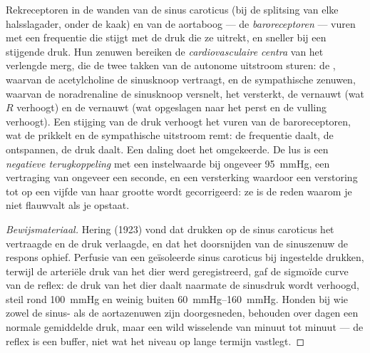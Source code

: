 \begin{definition}[De baroreflex]\label{def:b2:blood-pressure:baroreflex}
Rekreceptoren in de wanden van de sinus caroticus (bij de splitsing van
elke halsslagader, onder de kaak) en van de aortaboog --- de
\emph{baroreceptoren} --- vuren met een frequentie die stijgt met de druk die
ze uitrekt, en sneller bij een stijgende druk. Hun zenuwen bereiken de
\emph{cardiovasculaire centra} van het verlengde merg, die de twee takken
van de autonome uitstroom sturen: de , waarvan de acetylcholine
de sinusknoop vertraagt, en de sympathische zenuwen, waarvan de noradrenaline
de sinusknoop versnelt, het  versterkt, de  vernauwt
(wat $R$ verhoogt) en de  vernauwt (wat opgeslagen  naar het 
perst en de vulling verhoogt). Een stijging van de druk verhoogt het vuren
van de baroreceptoren, wat de  prikkelt en de sympathische
uitstroom remt: de frequentie daalt, de  ontspannen, de druk daalt.
Een daling doet het omgekeerde. De lus is een \emph{negatieve
terugkoppeling} met een instelwaarde bij ongeveer \qty{95}{mmHg}, een
vertraging van ongeveer een seconde, en een versterking waardoor een
verstoring tot op een vijfde van haar grootte wordt gecorrigeerd: ze is de
reden waarom je niet flauwvalt als je opstaat.
\end{definition}
\begin{proof}[Bewijsmateriaal]
Hering (1923) vond dat drukken op de sinus caroticus het  vertraagde en
de druk verlaagde, en dat het doorsnijden van de sinuszenuw de respons ophief.
Perfusie van een geïsoleerde sinus caroticus bij ingestelde drukken, terwijl
de arteriële druk van het dier werd geregistreerd, gaf de sigmoïde curve van
de reflex: de druk van het dier daalt naarmate de sinusdruk wordt verhoogd,
steil rond \qty{100}{mmHg} en weinig buiten \qtyrange{60}{160}{mmHg}.
Honden bij wie zowel de sinus- als de aortazenuwen zijn doorgesneden,
behouden over dagen een normale gemiddelde druk, maar een wild wisselende van
minuut tot minuut --- de reflex is een buffer, niet wat het niveau op lange
termijn vastlegt.
\end{proof}

